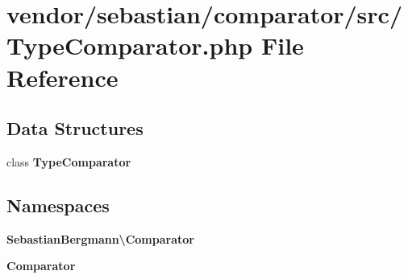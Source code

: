 \section{vendor/sebastian/comparator/src/\+Type\+Comparator.php File Reference}
\label{_type_comparator_8php}
\subsection*{Data Structures}
\begin{DoxyCompactItemize}
\item 
class {\bf Type\+Comparator}
\end{DoxyCompactItemize}
\subsection*{Namespaces}
\begin{DoxyCompactItemize}
\item 
 {\bf Sebastian\+Bergmann\textbackslash{}\+Comparator}
\item 
 {\bf Comparator}
\end{DoxyCompactItemize}
